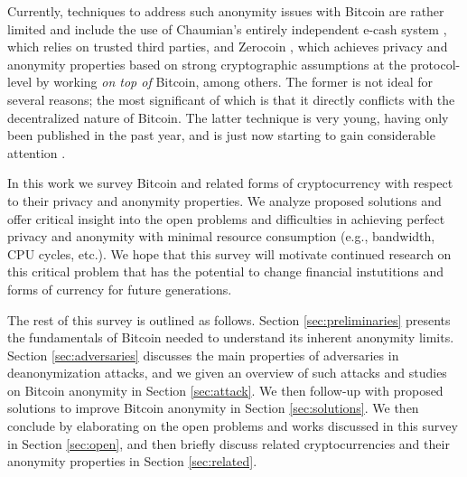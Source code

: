 Currently, techniques to address such anonymity issues with Bitcoin are rather limited and include the use of Chaumian's entirely independent e-cash system \cite{chaumain}, which relies on trusted third parties, and Zerocoin \cite{zerocoin}, which achieves privacy and anonymity properties based on strong cryptographic assumptions at the protocol-level by working \emph{on top of} Bitcoin, among others. The former is not ideal for several reasons; the most significant of which is that it directly conflicts with the decentralized nature of Bitcoin. The latter technique is very young, having only been published in the past year, and is just now starting to gain considerable attention \cite{pinocchio}. 

In this work we survey Bitcoin and related forms of cryptocurrency with respect to their privacy and anonymity properties. We analyze proposed solutions and offer critical insight into the open problems and difficulties in achieving perfect privacy and anonymity with minimal resource consumption (e.g., bandwidth, CPU cycles, etc.). We hope that this survey will motivate continued research on this critical problem that has the potential to change financial instutitions and forms of currency for future generations.

The rest of this survey is outlined as follows. Section \ref{sec:preliminaries} presents the fundamentals of Bitcoin needed to understand its inherent anonymity limits. Section \ref{sec:adversaries} discusses the main properties of adversaries in deanonymization attacks, and we given an overview of such attacks and studies on Bitcoin anonymity in Section \ref{sec:attack}. We then follow-up with proposed solutions to improve Bitcoin anonymity in Section \ref{sec:solutions}. We then conclude by elaborating on the open problems and works discussed in this survey in Section \ref{sec:open}, and then briefly discuss related cryptocurrencies and their anonymity properties in Section \ref{sec:related}.


